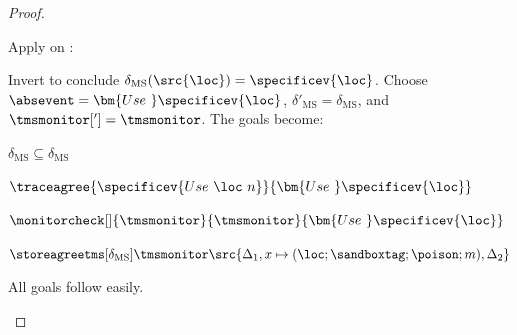 \documentclass[a4paper,names,dvipsnames]{article}
\begin{document}
\begin{proof}
\begin{description}
      Apply  on :
      Invert  to conclude $\delta_{\text{MS}}(\src{\loc})=\specificev{\loc}$.
      Choose $\absevent=\bm{Use\ }\specificev{\loc}$, $\delta'_{\text{MS}}=\delta_{\text{MS}}$, and $\tmsmonitor[']=\tmsmonitor$.
      The goals become:
      \begin{goals}
        \item $\delta_{\text{MS}}\subseteq\delta_{\text{MS}}$
        \item $\traceagree{\specificev{Use\ \loc\ n}}{\bm{Use\ }\specificev{\loc}}$
        \item $\monitorcheck[]{\tmsmonitor}{\tmsmonitor}{\bm{Use\ }\specificev{\loc}}$
        \item $\storeagreetms[\delta_{\text{MS}}]{\tmsmonitor}{\src{\Delta_1,x\mapsto(\loc;\sandboxtag;\poison;m),\Delta_2}}$
      \end{goals}
      All goals follow easily.


\end{description}
\end{proof}
\end{document}
